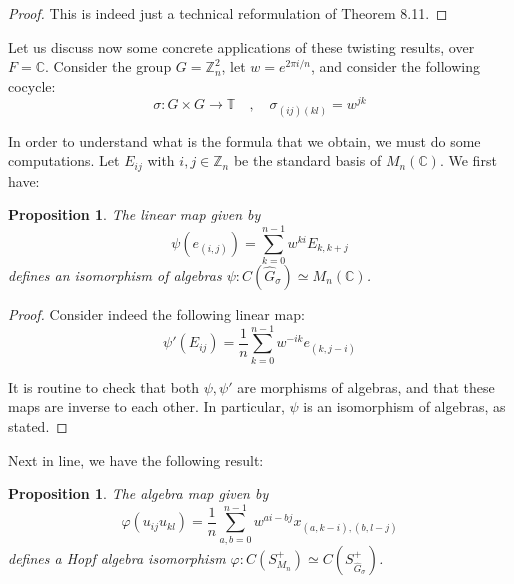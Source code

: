 \documentclass[12pt]{amsbook}
\newtheorem{proposition}[theorem]{Proposition}
\begin{document}
\begin{proof}
This is indeed just a technical reformulation of Theorem 8.11.
\end{proof}

Let us discuss now some concrete applications of these twisting results, over $F=\mathbb C$. Consider the group $G=\mathbb Z_n^2$, let $w=e^{2\pi i/n}$, and consider the following cocycle: 
$$\sigma:G\times G\to\mathbb T\quad,\quad 
\sigma_{(ij)(kl)}=w^{jk}$$ 

In order to understand what is the formula that we obtain, we must do some computations. Let $E_{ij}$ with $i,j \in\mathbb Z_n$ be the standard basis of $M_n(\mathbb C)$. We first have:

\begin{proposition}
The linear map given by
$$\psi(e_{(i,j)})=\sum_{k=0}^{n-1}{w}^{ki}E_{k,k+j}$$
defines an isomorphism of algebras $\psi:C(\widehat{G}_\sigma)\simeq M_n(\mathbb C)$. 
\end{proposition}

\begin{proof}
Consider indeed the following linear map:
$$\psi'(E_{ij})=\frac{1}{n}\sum_{k=0}^{n-1}{w}^{-ik}e_{(k,j-i)}$$
 
It is routine to check that both $\psi,\psi'$ are morphisms of algebras, and that these maps are inverse to each other. In particular, $\psi$ is an isomorphism of algebras, as stated.
\end{proof}

Next in line, we have the following result:

\begin{proposition}
The algebra map given by
$$\varphi(u_{ij}u_{kl}) = \frac{1}{n}\sum_{a,b=0}^{n-1}{w}^{ai-bj}x_{(a,k-i),(b,l-j)}$$
defines a Hopf algebra isomorphism $\varphi:C(S_{M_n}^+)\simeq C(S_{\widehat{G}_\sigma}^+)$.
\end{proposition}
\end{document}
